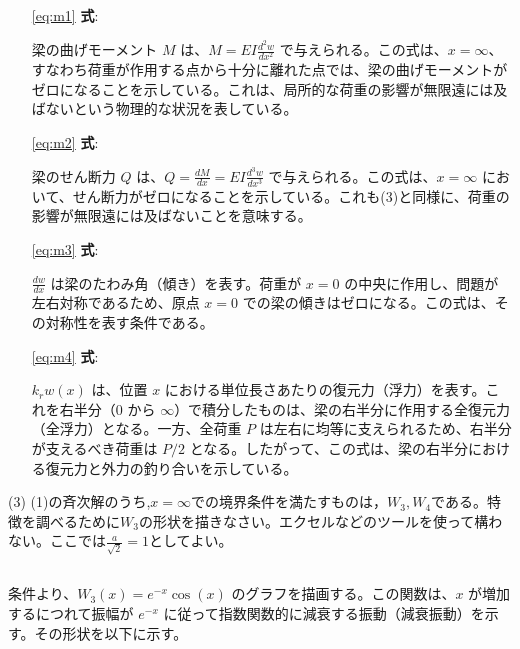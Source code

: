 \documentclass[dvipdfmx,a4paper]{jsarticle}
\begin{document}
    \subsection*{}
    \begin{itemize}
        \item[\eqref{eq:m1}] \textbf{式}: 
        
        梁の曲げモーメント $M$ は、$M = EI \frac{d^2w}{dx^2}$ で与えられる。この式は、$x=\infty$、すなわち荷重が作用する点から十分に離れた点では、梁の曲げモーメントがゼロになることを示している。これは、局所的な荷重の影響が無限遠には及ばないという物理的な状況を表している。
        \item[\eqref{eq:m2}] \textbf{式}: 
        
        梁のせん断力 $Q$ は、$Q = \frac{dM}{dx} = EI \frac{d^3w}{dx^3}$ で与えられる。この式は、$x=\infty$ において、せん断力がゼロになることを示している。これも(3)と同様に、荷重の影響が無限遠には及ばないことを意味する。
        \item[\eqref{eq:m3}] \textbf{式}: 
        
        $\frac{dw}{dx}$ は梁のたわみ角（傾き）を表す。荷重が $x=0$ の中央に作用し、問題が左右対称であるため、原点 $x=0$ での梁の傾きはゼロになる。この式は、その対称性を表す条件である。
        \item[\eqref{eq:m4}] \textbf{式}: 
        
        $k_r w(x)$ は、位置 $x$ における単位長さあたりの復元力（浮力）を表す。これを右半分（$0$ から $\infty$）で積分したものは、梁の右半分に作用する全復元力（全浮力）となる。一方、全荷重 $P$ は左右に均等に支えられるため、右半分が支えるべき荷重は $P/2$ となる。したがって、この式は、梁の右半分における復元力と外力の釣り合いを示している。
    \end{itemize}
    
    \vspace{1cm}
    
    (3) (1)の斉次解のうち,$x=\infty$での境界条件を満たすものは，$W_3,W_4$である。特徴を調べるために$W_3$の形状を描きなさい。エクセルなどのツールを使って構わない。ここでは$\frac{a}{\sqrt{2}}=1$としてよい。
    
    \subsection*{}
    条件より、$W_3(x) = e^{-x} \cos(x)$ のグラフを描画する。この関数は、$x$ が増加するにつれて振幅が $e^{-x}$ に従って指数関数的に減衰する振動（減衰振動）を示す。その形状を以下に示す。
    
\end{document}
